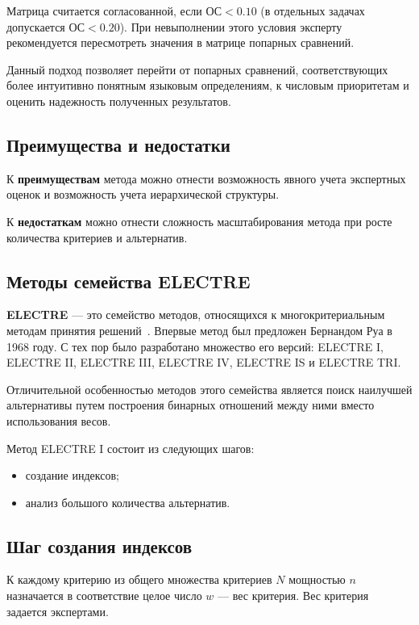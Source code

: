 Матрица считается согласованной, если \(\text{ОС} < 0.10\) (в отдельных задачах допускается \(\text{ОС} < 0.20\)).
При невыполнении этого условия эксперту рекомендуется пересмотреть значения в матрице попарных сравнений.

Данный подход позволяет перейти от попарных сравнений, соответствующих более интуитивно понятным языковым определениям, к числовым приоритетам и оценить надежность полученных результатов.

\subsection*{Преимущества и недостатки}

К \textbf{преимуществам} метода можно отнести возможность явного учета экспертных оценок и возможность учета иерархической структуры.

К \textbf{недостаткам} можно отнести сложность масштабирования метода при росте количества критериев и альтернатив.

\subsection{Методы семейства ELECTRE}

\textbf{ELECTRE} --- это семейство методов, относящихся к многокритериальным методам принятия решений~\cite{ELECTRE}.
Впервые метод был предложен Бернандом Руа в 1968 году.
С тех пор было разработано множество его версий: ELECTRE I, ELECTRE II, ELECTRE III, ELECTRE IV, ELECTRE IS и ELECTRE TRI.

Отличительной особенностью методов этого семейства является поиск наилучшей альтернативы путем построения бинарных отношений между ними вместо использования весов.

Метод ELECTRE I состоит из следующих шагов:
\begin{itemize} 
    \item создание индексов;
    \item анализ большого количества альтернатив.
\end{itemize}

\subsection*{Шаг создания индексов}

К каждому критерию из общего множества критериев $N$ мощностью $n$ назначается в соответствие целое число $w$ --- вес критерия.
Вес критерия задается экспертами.


